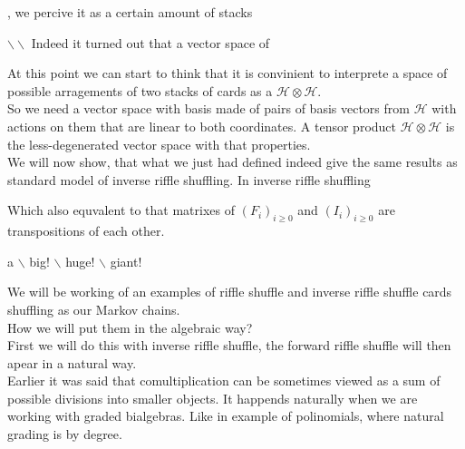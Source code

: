 \documentclass[a4paper]{article}
\begin{document}
, we percive it as a certain
amount of stacks

$\backslash\backslash$
Indeed it turned out that a vector space of

At this point we can start to think that it is convinient to interprete a space of possible arragements
of two stacks of cards as a $\mathcal{H} \otimes \mathcal{H}$. \\[4pt]

So we need a vector space with basis made of pairs of basis vectors from $\mathcal{H}$ with actions on them
that are linear to both coordinates. A tensor product $\mathcal{H} \otimes \mathcal{H}$
is the less-degenerated vector space with that properties.\\[4pt]

We will now show, that what we just had defined indeed give the same results as standard model of inverse
riffle shuffling.
In inverse riffle shuffling

Which also equvalent to that matrixes of $(F_i)_{i \geq 0}$ and $(I_i)_{i \geq 0}$ are transpositions of
each other.

a $\backslash$ big! $\backslash$ huge! $\backslash$ giant!

We will be working of an examples of riffle shuffle and inverse riffle shuffle cards shuffling as
our Markov chains. \\
How we will put them in the algebraic way? \\
First we will do this with inverse riffle shuffle, the forward riffle shuffle will then apear in a natural
way. \\


Earlier it was said that comultiplication can be sometimes viewed as a sum
of possible divisions into smaller objects. It happends naturally when we are working with graded bialgebras.
Like in example of polinomials, where natural grading is by degree. \\
\end{document}
